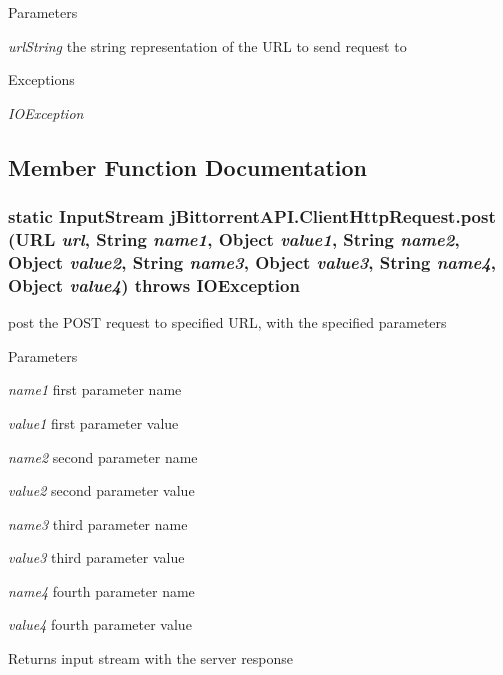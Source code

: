 \begin{DoxyParams}{Parameters}
\item[{\em urlString}]the string representation of the URL to send request to \end{DoxyParams}

\begin{DoxyExceptions}{Exceptions}
\item[{\em IOException}]\end{DoxyExceptions}


\subsection{Member Function Documentation}
\hypertarget{classj_bittorrent_a_p_i_1_1_client_http_request_a8954c914c904a99b844c8c6db0f08206}{
\subsubsection[{post}]{\setlength{\rightskip}{0pt plus 5cm}static InputStream jBittorrentAPI.ClientHttpRequest.post (URL {\em url}, \/  String {\em name1}, \/  Object {\em value1}, \/  String {\em name2}, \/  Object {\em value2}, \/  String {\em name3}, \/  Object {\em value3}, \/  String {\em name4}, \/  Object {\em value4})  throws IOException }}
\label{classj_bittorrent_a_p_i_1_1_client_http_request_a8954c914c904a99b844c8c6db0f08206}
post the POST request to specified URL, with the specified parameters 
\begin{DoxyParams}{Parameters}
\item[{\em name1}]first parameter name \item[{\em value1}]first parameter value \item[{\em name2}]second parameter name \item[{\em value2}]second parameter value \item[{\em name3}]third parameter name \item[{\em value3}]third parameter value \item[{\em name4}]fourth parameter name \item[{\em value4}]fourth parameter value \end{DoxyParams}
\begin{DoxyReturn}{Returns}
input stream with the server response 
\end{DoxyReturn}

